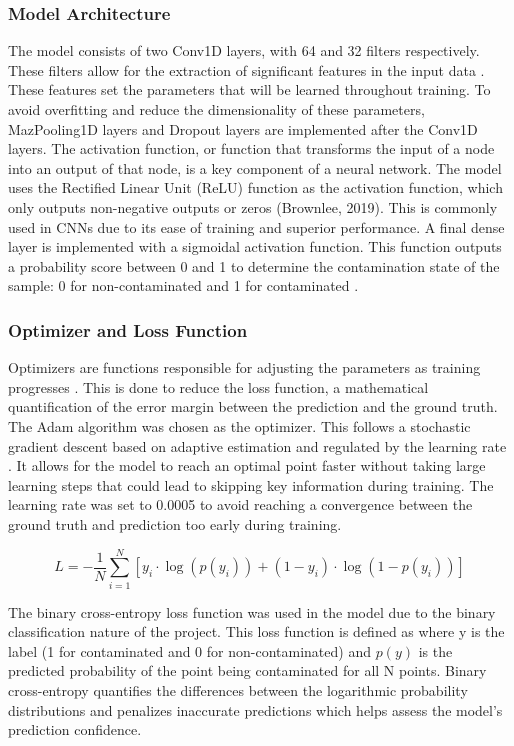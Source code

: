 \documentclass[final, 3p, 11pt]{elsarticle}
\begin{document}
\subsubsection{Model Architecture}
The model consists of two Conv1D layers, with 64 and 32 filters respectively. These filters allow for the extraction of significant features in the input data \citep{nisha_2020_applications}. These features set the parameters that will be learned throughout training. To avoid overfitting and reduce the dimensionality of these parameters, MazPooling1D layers and Dropout layers are implemented after the Conv1D layers. The activation function, or function that transforms the input of a node into an output of that node, is a key component of a neural network. The model uses the Rectified Linear Unit (ReLU) function as the activation function, which only outputs non-negative outputs or zeros (Brownlee, 2019). This is commonly used in CNNs due to its ease of training and superior performance. A final dense layer is implemented with a sigmoidal activation function. This function outputs a probability score between 0 and 1 to determine the contamination state of the sample: 0 for non-contaminated and 1 for contaminated \citep{saeed_2021_a}.

\subsubsection{Optimizer and Loss Function}
Optimizers are functions responsible for adjusting the parameters as training progresses \citep{eitcaacademy_2023_what}. This is done to reduce the loss function, a mathematical quantification of the error margin between the prediction and the ground truth. The Adam algorithm was chosen as the optimizer. This follows a stochastic gradient descent based on adaptive estimation and regulated by the learning rate \citep{kerasteam_keras}. It allows for the model to reach an optimal point faster without taking large learning steps that could lead to skipping key information during training. The learning rate was set to 0.0005 to avoid reaching a convergence between the ground truth and prediction too early during training.

\begin{equation}
    L = -\frac{1}{N} \sum_{i=1}^{N} \left[y_i \cdot \log(p(y_i)) + (1 - y_i) \cdot \log(1 - p(y_i)) \right]
  \label{eq:cross_entropy}
\end{equation}

The binary cross-entropy loss function was used in the model due to the binary classification nature of the project. This loss function is defined as where y is the label (1 for contaminated and 0 for non-contaminated) and $p(y)$ is the predicted probability of the point being contaminated for all N points. Binary cross-entropy quantifies the differences between the logarithmic probability distributions and penalizes inaccurate predictions which helps assess the model’s prediction confidence.
\end{document}
